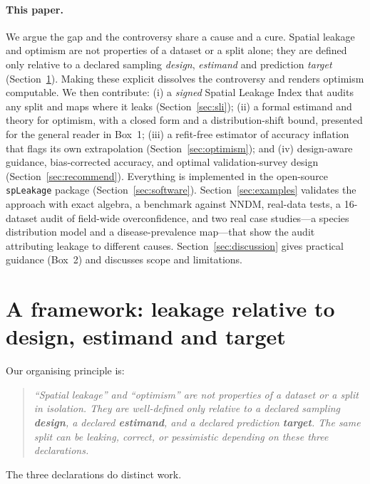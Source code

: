 \documentclass[11pt,a4paper]{article}
\begin{document}
\paragraph{This paper.}
We argue the gap and the controversy share a cause and a cure. Spatial leakage and
optimism are not properties of a dataset or a split alone; they are defined only
relative to a declared sampling \emph{design}, \emph{estimand} and prediction
\emph{target} (Section~\ref{sec:framework}). Making these explicit dissolves the
controversy and renders optimism computable. We then contribute: (i) a \emph{signed}
Spatial Leakage Index that audits any split and maps where it leaks
(Section~\ref{sec:sli}); (ii) a formal estimand and theory for optimism, with a
closed form and a distribution-shift bound, presented for the general reader in
Box~1; (iii) a refit-free estimator of accuracy inflation that flags its own
extrapolation (Section~\ref{sec:optimism}); and (iv) design-aware guidance,
bias-corrected accuracy, and optimal validation-survey design
(Section~\ref{sec:recommend}). Everything is implemented in the open-source
\texttt{spLeakage} package (Section~\ref{sec:software}). Section~\ref{sec:examples}
validates the approach with exact algebra, a benchmark against NNDM, real-data
tests, a 16-dataset audit of field-wide overconfidence, and two real case studies---a
species distribution model and a disease-prevalence map---that show the audit
attributing leakage to different causes. Section~\ref{sec:discussion} gives practical
guidance (Box~2) and discusses scope and limitations.

\section{A framework: leakage relative to design, estimand and
target}\label{sec:framework}

Our organising principle is:

\begin{quote}\itshape
``Spatial leakage'' and ``optimism'' are not properties of a dataset or a split in
isolation. They are well-defined only relative to a declared sampling
\textbf{design}, a declared \textbf{estimand}, and a declared prediction
\textbf{target}. The same split can be leaking, correct, or pessimistic depending on
these three declarations.
\end{quote}

\noindent The three declarations do distinct work.
\end{document}

